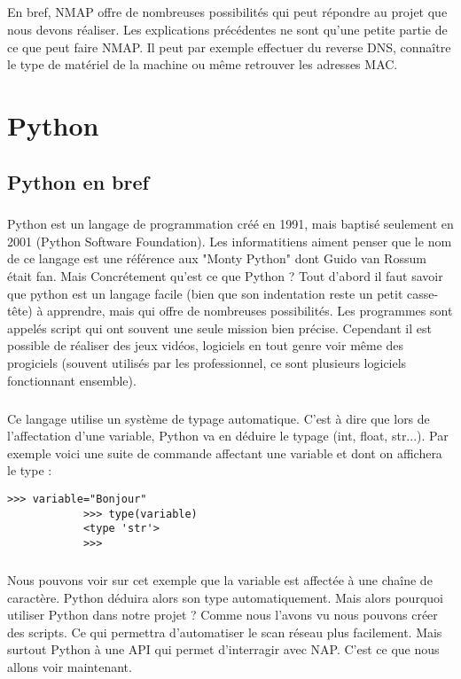\documentclass[12pt]{report}
\begin{document}
			\paragraph{}
				En bref, NMAP offre de nombreuses possibilités qui peut répondre au projet que nous devons réaliser. Les explications précédentes ne sont qu'une petite partie de ce que peut faire NMAP. Il peut par exemple effectuer du reverse DNS, connaître le type de matériel de la machine ou même retrouver les adresses MAC.
	\chapter{Python}
		\section{Python en bref}
			\paragraph{}
				Python est un langage de programmation créé en 1991, mais baptisé seulement en 2001 (Python Software Foundation). Les informatitiens aiment penser que le nom de ce langage est une référence aux "Monty Python" dont Guido van Rossum était fan. Mais Concrétement qu'est ce que Python ? Tout d'abord il faut savoir que python est un langage facile (bien que son indentation reste un petit casse-tête) à apprendre, mais qui offre de nombreuses possibilités. Les programmes sont appelés script qui ont souvent une seule mission bien précise. Cependant il est possible de réaliser des jeux vidéos, logiciels en tout genre voir même des progiciels (souvent utilisés par les professionnel, ce sont plusieurs logiciels fonctionnant ensemble).
			\paragraph{}
				Ce langage utilise un système de typage automatique. C'est à dire que lors de l'affectation d'une variable, Python va en déduire le typage (int, float, str...). Par exemple voici une suite de commande affectant une variable et dont on affichera le type :
				\begin{lstlisting}[caption=Affectation variable en Python, captionpos=b]
			>>> variable="Bonjour"
			>>> type(variable)
			<type 'str'>
			>>>
				\end{lstlisting}
			\paragraph{}
				Nous pouvons voir sur cet exemple que la variable est affectée à une chaîne de caractère. Python déduira alors son type automatiquement. Mais alors pourquoi utiliser Python dans notre projet ? Comme nous l'avons vu nous pouvons créer des scripts. Ce qui permettra d'automatiser le scan réseau plus facilement. Mais surtout Python à une API qui permet d'interragir avec NAP. C'est ce que nous allons voir maintenant.
\end{document}
